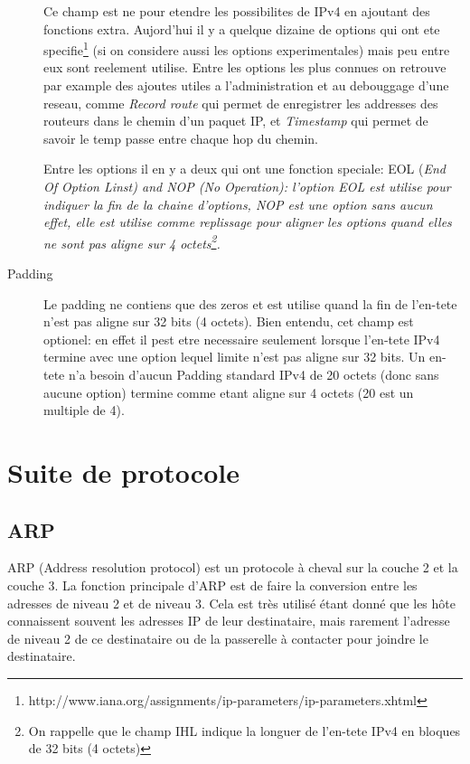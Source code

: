 \documentclass[twoside,openright,a4paper,11pt,french]{article}
\begin{document}
\begin{description}
Ce champ est ne pour etendre les possibilites de IPv4 en ajoutant des fonctions extra.
Aujord'hui il y a quelque dizaine de options qui ont ete specifie\footnote
{http://www.iana.org/assignments/ip-parameters/ip-parameters.xhtml} (si on
considere aussi les options experimentales) mais peu entre eux sont reelement
utilise. 
Entre les options les plus connues on retrouve par example des ajoutes
utiles a l'administration et au debouggage d'une reseau, comme {\it Record route}
qui permet de enregistrer les addresses des routeurs dans le chemin d'un 
paquet IP, et {\it Timestamp} qui permet de savoir le temp passe 
entre chaque hop du chemin.

Entre les options il en y a deux qui ont une fonction speciale: EOL 
(\it End Of Option Linst) and NOP ({\it No Operation}): l'option EOL 
est utilise pour indiquer la fin de la chaine d'options, NOP est une option
sans aucun effet, elle est utilise comme replissage pour aligner les options 
quand elles ne sont pas aligne sur 4 octets\footnote {On rappelle que 
le champ IHL indique la longuer de l'en-tete IPv4 en bloques de 32 bits 
(4 octets)}.



\item [Padding] 
Le padding ne contiens que des zeros et est utilise quand la fin de l'en-tete
n'est pas aligne sur 32 bits (4 octets). Bien entendu, cet champ est optionel:
en effet il pest etre necessaire seulement lorsque l'en-tete IPv4 termine avec
une option lequel limite n'est pas aligne sur 32 bits. Un en-tete n'a besoin
d'aucun Padding standard IPv4 de 20 octets (donc sans aucune option) termine
comme etant aligne sur 4 octets (20 est un multiple de 4).



















\end{description}



\section{Suite de protocole}

\subsection{ARP}
ARP (Address resolution protocol) est un protocole à cheval sur la couche 2 et
la couche 3. La fonction principale d'ARP est de faire la conversion entre les
adresses de niveau 2 et de niveau 3. Cela est très utilisé étant donné que les
hôte connaissent souvent les adresses IP de leur destinataire, mais rarement
l'adresse de niveau 2 de ce destinataire ou de la passerelle à contacter pour joindre
le destinataire.
\end{document}
